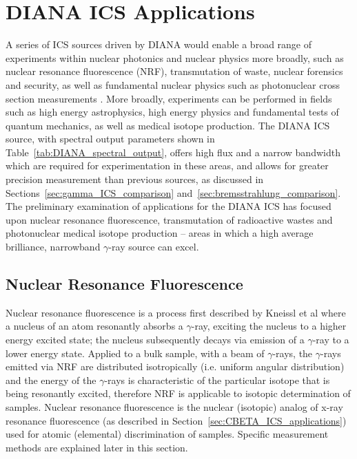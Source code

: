 \documentclass[../main.tex]{subfiles}
\begin{document}
\section{DIANA ICS Applications}
\label{sec:DIANA_ICS_applications}

A series of ICS sources driven by DIANA would enable a broad range of experiments within nuclear photonics \cite{nedorezov2017nuclear,budker2021expanding} and nuclear physics more broadly, such as nuclear resonance fluorescence (NRF), transmutation of waste, nuclear forensics and security, as well as fundamental nuclear physics such as photonuclear cross section measurements \cite{renstrom2018verification}.
More broadly, experiments can be performed in fields such as high energy astrophysics, high energy physics and fundamental tests of quantum mechanics, as well as medical isotope production. The DIANA ICS source, with spectral output parameters shown in Table~\ref{tab:DIANA_spectral_output}, offers high flux and a narrow bandwidth which are required for experimentation in these areas, and allows for greater precision measurement than previous sources, as discussed in Sections~\ref{sec:gamma_ICS_comparison} and~\ref{sec:bremsstrahlung_comparison}. The preliminary examination of applications for the DIANA ICS has focused upon nuclear resonance fluorescence, transmutation of radioactive wastes and photonuclear medical isotope production -- areas in which a high average brilliance, narrowband $\gamma$-ray source can excel.  

\subsection{Nuclear Resonance Fluorescence}

Nuclear resonance fluorescence is a process first described by Kneissl et al \cite{kneissl1996investigation} where a nucleus of an atom resonantly absorbs a $\gamma$-ray, exciting the nucleus to a higher energy excited state; the nucleus subsequently decays via emission of a $\gamma$-ray to a lower energy state. Applied to a bulk sample, with a beam of $\gamma$-rays, the $\gamma$-rays emitted via NRF are distributed isotropically (i.e. uniform angular distribution) and the energy of the $\gamma$-rays is characteristic of the particular isotope that is being resonantly excited, therefore NRF is applicable to isotopic determination of samples. Nuclear resonance fluorescence is the nuclear (isotopic) analog of x-ray resonance fluorescence (as described in Section~\ref{sec:CBETA_ICS_applications}) used for atomic (elemental) discrimination of samples. Specific measurement methods are explained later in this section. 
\end{document}
